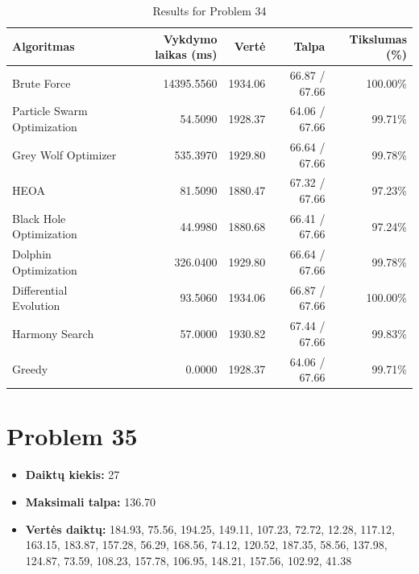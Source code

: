 \documentclass[a4paper,11pt]{article}
\begin{document}
\begin{table}[h!]
\centering
\begin{tabular}{lrrrr}
\toprule
\textbf{Algoritmas} & \textbf{Vykdymo laikas (ms)} & \textbf{Vertė} & \textbf{Talpa} & \textbf{Tikslumas (\%)} \\
\midrule
Brute Force & 14395.5560 & 1934.06 & 66.87 / 67.66 & 100.00\% \\
Particle Swarm Optimization & 54.5090 & 1928.37 & 64.06 / 67.66 & 99.71\% \\
Grey Wolf Optimizer & 535.3970 & 1929.80 & 66.64 / 67.66 & 99.78\% \\
HEOA & 81.5090 & 1880.47 & 67.32 / 67.66 & 97.23\% \\
Black Hole Optimization & 44.9980 & 1880.68 & 66.41 / 67.66 & 97.24\% \\
Dolphin Optimization & 326.0400 & 1929.80 & 66.64 / 67.66 & 99.78\% \\
Differential Evolution & 93.5060 & 1934.06 & 66.87 / 67.66 & 100.00\% \\
Harmony Search & 57.0000 & 1930.82 & 67.44 / 67.66 & 99.83\% \\
Greedy & 0.0000 & 1928.37 & 64.06 / 67.66 & 99.71\% \\
\bottomrule
\end{tabular}
\caption{Results for Problem 34}
\end{table}
\clearpage

\section*{Problem 35}
\begin{itemize}
    \item \textbf{Daiktų kiekis:} 27
    \item \textbf{Maksimali talpa:} 136.70
    \item \textbf{Vertės daiktų:} 184.93, 75.56, 194.25, 149.11, 107.23, 72.72, 12.28, 117.12, 163.15, 183.87, 157.28, 56.29, 168.56, 74.12, 120.52, 187.35, 58.56, 137.98, 124.87, 73.59, 108.23, 157.78, 106.95, 148.21, 157.56, 102.92, 41.38
\end{itemize}
\end{document}
